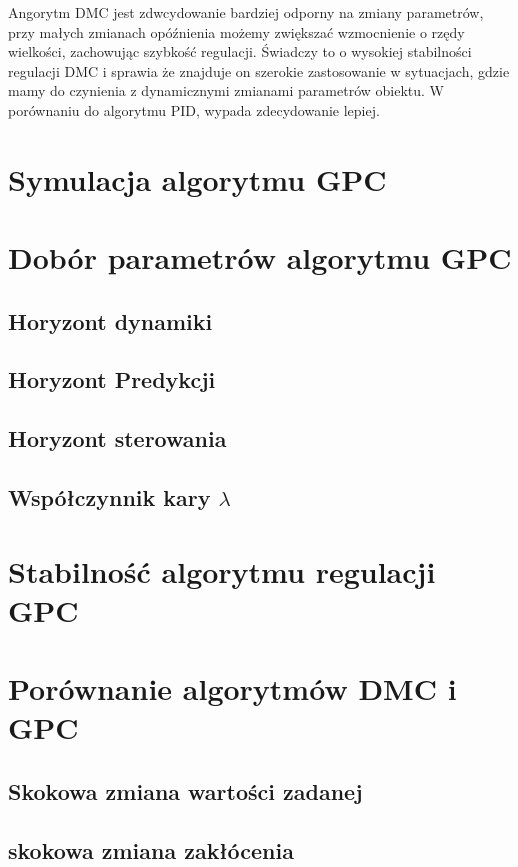 \documentclass[a4paper, 11pt]{article}
\begin{document}
Angorytm DMC jest zdwcydowanie bardziej odporny na zmiany parametrów, przy małych zmianach opóźnienia możemy zwiększać wzmocnienie o rzędy wielkości, zachowując szybkość regulacji. Świadczy to o wysokiej stabilności regulacji DMC i sprawia że znajduje on szerokie zastosowanie w sytuacjach, gdzie mamy do czynienia z dynamicznymi zmianami parametrów obiektu. W porównaniu do algorytmu PID, wypada zdecydowanie lepiej. 


\section{Symulacja algorytmu GPC}
\section{Dobór parametrów algorytmu GPC}
\subsection{Horyzont dynamiki}
\subsection{Horyzont Predykcji}
\subsection{Horyzont sterowania}
\subsection{Współczynnik kary $\lambda$}
\section{Stabilność algorytmu regulacji GPC}
\section{Porównanie algorytmów DMC i GPC}
\subsection{Skokowa zmiana wartości zadanej}
\subsection{skokowa zmiana zakłócenia}



 
 

 
 
\end{document}
